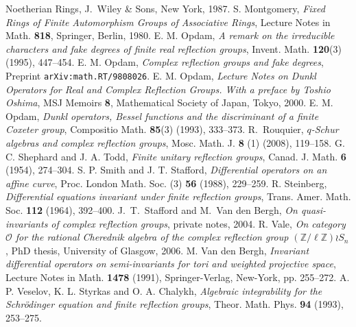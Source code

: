 \documentclass{amsart}
\theoremstyle{definition}
\theoremstyle{remark}
\numberwithin{equation}{section}
\begin{document}
\begin{thebibliography}{A}
{Noetherian Rings}, J.~Wiley \& Sons, New York, 1987.
S. Montgomery, \textit{Fixed Rings of Finite Automorphism Groups
of Associative Rings}, Lecture Notes in Math. \textbf{818}, Springer, Berlin, 1980.
E. M. Opdam, \textit{A remark on the irreducible characters and
fake degrees of finite real reflection groups}, Invent. Math.
\textbf{120}(3) (1995), 447--454.
E. M. Opdam, \textit{Complex reflection groups and fake degrees},
Preprint {\tt{arXiv:math.RT/9808026}}.
E. M. Opdam, \textit{Lecture Notes on Dunkl Operators for Real and
Complex Reflection Groups. With a preface by Toshio Oshima}, MSJ
Memoirs \textbf{8}, Mathematical Society of Japan, Tokyo, 2000.
E. M. Opdam, \textit{Dunkl operators, Bessel functions and the
discriminant of a finite Coxeter group}, Compositio Math.
\textbf{85}(3) (1993), 333--373.
R.~Rouquier, \textit{$q$-Schur algebras and complex reflection groups},
Mosc. Math. J. \textbf{8} (1) (2008), 119--158.
G. C. Shephard and J. A. Todd, \textit{Finite unitary reflection groups},
Canad. J. Math. \textbf{6} (1954), 274--304.
S. P. Smith and J. T. Stafford, \textit{Differential
operators on an affine curve}, Proc. London Math. Soc.
(3) \textbf{56} (1988), 229--259.
R. Steinberg, \textit{Differential equations invariant under
finite reflection groups}, Trans. Amer. Math. Soc. \textbf{112} (1964), 392--400.
 J.~T.~Stafford and M.~Van den Bergh,
\textit{On quasi-invariants of complex reflection groups}, private notes, 2004.
R. Vale, \textit{On category ${\mathcal{O}}$ for the rational Cherednik
algebra of the complex reflection group $({\mathbb{Z}}/\ell{\mathbb{Z}})\wr S_n$}, PhD
thesis, University of Glasgow, 2006.
 M. Van den Bergh, \textit{Invariant differential
operators on semi-invariants for tori and weighted projective
space}, Lecture Notes in Math. \textbf{1478} (1991),
Springer-Verlag, New-York, pp. 255--272.
A. P. Veselov, K. L. Styrkas and O. A. Chalykh, \textit{Algebraic integrability
for the Schr\"odinger equation and finite reflection groups}, Theor. Math.
Phys. \textbf{94} (1993), 253--275.
\end{thebibliography}
\end{document}
